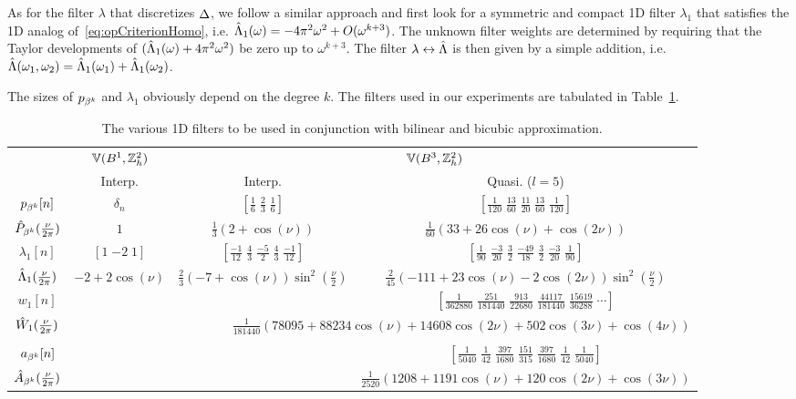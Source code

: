 As for the filter $\lambda$ that discretizes $\laplacian$, we follow a
similar approach and first look for a symmetric and compact 1D filter
$\lambda_1$ that satisfies the 1D analog of~\eqref{eq:opCriterionHomo},
i.e. $\ft{\Lambda}_1(\omega) = -4\pi^2\omega^2 + O(\omega^{k+3})$. The
unknown filter weights are determined by requiring that the Taylor
developments of $(\ft{\Lambda}_1(\omega) + 4\pi^2\omega^2)$ be zero up to
$\omega^{k+3}$. The filter $\ftpairs{\lambda}{\ft{\Lambda}}$ is then given by a
simple addition, i.e. $\ft{\Lambda}(\omega_1,\omega_2) =
\ft{\Lambda}_1(\omega_1) + \ft{\Lambda}_1(\omega_2)$. 

The sizes of $p_{\cbs^k}$ and $\lambda_1$ obviously depend on the degree
$k$. The filters used in our experiments are tabulated in
Table~\ref{tab:filters}.

\begin{table}[t!]
  \footnotesize
  \caption[Poisson filters for the Cartesian lattice]{The various 1D filters to
  be used in conjunction with bilinear and bicubic approximation.}
  \label{tab:filters}
  \centering
  \begin{tabular}{cc|cc}
    \toprule
     & $\aspace{\ints^2_h}{\tpbs^1}$ & \multicolumn{2}{c}{$\aspace{\ints^2_h}{\tpbs^3}$}\\
     & Interp. & Interp. & Quasi. ($l=5$)\\
    \midrule
    $p_{\cbs^k}[n]$ & $\delta_n$ & $[\tfrac{1}{6}\; \tfrac{2}{3}\; \tfrac{1}{6}]$& $[\tfrac{1}{120}\; \tfrac{13}{60}\; \tfrac{11}{20}\; \tfrac{13}{60}\; \tfrac{1}{120}]$\\
    $\ft{P}_{\cbs^k}(\tfrac{\nu}{2\pi})$ & $1$ & $\tfrac{1}{3}(2 + \cos(\nu))$&
    $\tfrac{1}{60}(33+26\cos(\nu) + \cos(2\nu))$\\
    \midrule
    $\lambda_1[n]$ & $[1\; {-2}\; 1]$ & $[\tfrac{-1}{12}\; \tfrac{4}{3}\;
    \tfrac{-5}{2}\; \tfrac{4}{3}\; \tfrac{-1}{12}]$& $[\tfrac{1}{90}\; \tfrac{-3}{20}\; \tfrac{3}{2}\; \tfrac{-49}{18}\; \tfrac{3}{2}\; \tfrac{-3}{20}\; \tfrac{1}{90}]$\\
    $\ft{\Lambda}_1(\tfrac{\nu}{2\pi})$ & $-2 + 2\cos(\nu)$&
    $\tfrac{2}{3}(-7+\cos(\nu))\sin^2(\tfrac{\nu}{2})$& $\tfrac{2}{45}(-111 + 23\cos(\nu) - 2\cos(2\nu))\sin^2(\tfrac{\nu}{2})$\\
    \midrule
    $w_1[n]$ & & & $[\tfrac{1}{362880}\; \tfrac{251}{181440}\;
    \tfrac{913}{22680}\; \tfrac{44117}{181440}\; \tfrac{15619}{36288}\; \cdots]$\\
    $\ft{W}_1(\tfrac{\nu}{2\pi})$ & &
    \multicolumn{2}{r}{$\scriptscriptstyle{\tfrac{1}{181440}(78095 + 88234\cos(\nu) + 14608\cos(2\nu) + 502\cos(3\nu)+ \cos(4\nu))}$}\\
    & & & \\
    $a_{\cbs^k}[n]$ & & & $[\tfrac{1}{5040}\; \tfrac{1}{42}\;
    \tfrac{397}{1680}\; \tfrac{151}{315}\; \tfrac{397}{1680}\; \tfrac{1}{42}\; \tfrac{1}{5040}]$\\
    $\ft{A}_{\cbs^k}(\tfrac{\nu}{2\pi})$ & & & $\scriptscriptstyle{\tfrac{1}{2520}(1208 + 1191\cos(\nu) + 120\cos(2\nu) + \cos(3\nu))}$\\
    \bottomrule
  \end{tabular}
\end{table}

